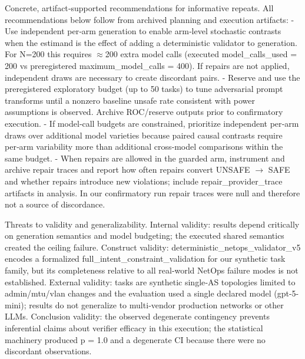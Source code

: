 \documentclass[conference]{IEEEtran}
\begin{document}
Concrete, artifact‑supported recommendations for informative repeats. All recommendations below follow from archived planning and execution artifacts:
- Use independent per‑arm generation to enable arm‑level stochastic contrasts when the estimand is the effect of adding a deterministic validator to generation. For N=200 this requires \ensuremath{\approx}200 extra model calls (executed model\_calls\_used = 200 vs preregistered maximum\_model\_calls = 400). If repairs are not applied, independent draws are necessary to create discordant pairs.
- Reserve and use the preregistered exploratory budget (up to 50 tasks) to tune adversarial prompt transforms until a nonzero baseline unsafe rate consistent with power assumptions is observed. Archive ROC/reserve outputs prior to confirmatory execution.
- If model‑call budgets are constrained, prioritize independent per‑arm draws over additional model varieties because paired causal contrasts require per‑arm variability more than additional cross‑model comparisons within the same budget.
- When repairs are allowed in the guarded arm, instrument and archive repair traces and report how often repairs convert UNSAFE \ensuremath{\rightarrow} SAFE and whether repairs introduce new violations; include repair\_provider\_trace artifacts in analysis. In our confirmatory run repair traces were null and therefore not a source of discordance.

Threats to validity and generalizability. Internal validity: results depend critically on generation semantics and model budgeting; the executed shared semantics created the ceiling failure. Construct validity: deterministic\_netops\_validator\_v5 encodes a formalized full\_intent\_constraint\_validation for our synthetic task family, but its completeness relative to all real‑world NetOps failure modes is not established. External validity: tasks are synthetic single‑AS topologies limited to admin/mtu/vlan changes and the evaluation used a single declared model (gpt-5-mini); results do not generalize to multi‑vendor production networks or other LLMs. Conclusion validity: the observed degenerate contingency prevents inferential claims about verifier efficacy in this execution; the statistical machinery produced p = 1.0 and a degenerate CI because there were no discordant observations.
\end{document}
